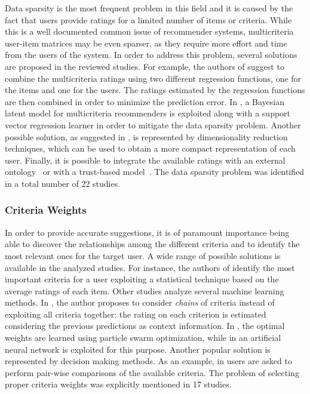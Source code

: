 Data sparsity is the most frequent problem in this field and it is caused by the fact that users provide ratings for a limited number of items or criteria. While this is a well documented common issue of recommender systems, multicriteria user-item matrices may be even sparser, as they require more effort and time from the users of the system. In order to address this problem, several solutions are proposed in the reviewed studies. For example, the authors of  suggest to combine the multicriteria ratings using two different regression functions, one for the items and one for the users. The ratings estimated by the regression functions are then combined in order to minimize the prediction error. In , a Bayesian latent model for multicriteria recommenders is exploited along with a support vector regression learner in order to mitigate the data sparsity problem. Another possible solution, as suggested in , is represented by dimensionality reduction techniques, which can be used to obtain a more compact representation of each user. Finally, it is possible to integrate the available ratings with an external ontology~ or with a trust-based model~. The data sparsity problem was identified in a total number of 22 studies.

\subsubsection{Criteria Weights}
\label{mcr:sec:criteria-weights}

In order to provide accurate suggestions, it is of paramount importance being able to discover the relationships among the different criteria and to identify the most relevant ones for the target user. A wide range of possible solutions is available in the analyzed studies. For instance, the authors of  identify the most important criteria for a user exploiting a statistical technique based on the average ratings of each item. Other studies analyze several machine learning methods. In , the author proposes to consider \emph{chains} of criteria instead of exploiting all criteria together: the rating on each criterion is estimated considering the previous predictions as context information. In , the optimal weights are learned using particle swarm optimization, while in  an artificial neural network is exploited for this purpose. Another popular solution is represented by decision making methods. As an example, in  users are asked to perform pair-wise comparisons of the available criteria. The problem of selecting proper criteria weights was explicitly mentioned in 17 studies.


